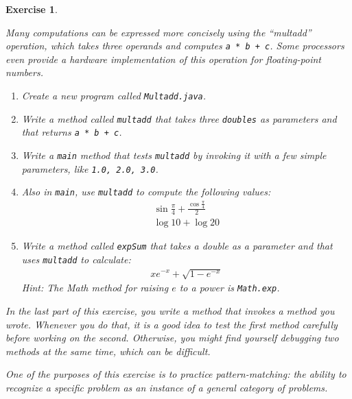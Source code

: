 \documentclass[12pt]{book}
\theoremstyle{exercise}
\newtheorem{exercise}{Exercise}[chapter]
\newcommand{\java}[1]{\verb"#1"}
\begin{document}
\begin{exercise}
\label{ex.multadd}

Many computations can be expressed more concisely using the ``multadd'' operation, which takes three operands and computes \java{a * b + c}.
Some processors even provide a hardware implementation of this operation for floating-point numbers.

\begin{enumerate}

\item Create a new program called {\tt Multadd.java}.

\item Write a method called \java{multadd} that takes three \java{doubles} as parameters and that returns \java{a * b + c}.

\item Write a \java{main} method that tests \java{multadd} by invoking it with a few simple parameters, like \java{1.0, 2.0, 3.0}.

\item Also in \java{main}, use \java{multadd} to compute the following values:
%
\begin{eqnarray*}
& \sin \frac{\pi}{4} + \frac{\cos \frac{\pi}{4}}{2} & \\
& \log 10 + \log 20 &
\end{eqnarray*}

\item Write a method called \java{expSum} that takes a double as a parameter and that uses \java{multadd} to calculate:
%
\begin{eqnarray*}
x e^{-x} + \sqrt{1 - e^{-x}}
\end{eqnarray*}
%
Hint: The Math method for raising $e$ to a power is \java{Math.exp}.

\end{enumerate}

In the last part of this exercise, you write a method that invokes a method you wrote.
Whenever you do that, it is a good idea to test the first method carefully before working on the second.
Otherwise, you might find yourself debugging two methods at the same time, which can be difficult.

One of the purposes of this exercise is to practice pattern-matching: the ability to recognize a specific problem as an instance of a general category of problems.

\end{exercise}
\end{document}
